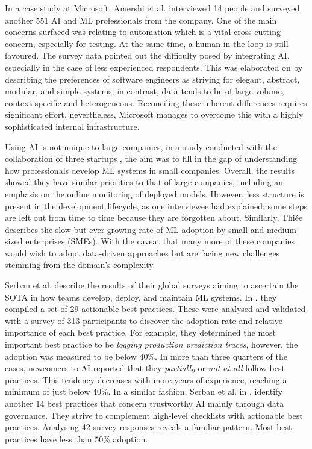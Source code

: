 In a case study at Microsoft, Amershi et al. \cite{amershi2019software} interviewed 14 people and surveyed another 551 AI and ML professionals from the company. One of the main concerns surfaced was relating to automation which is a vital cross-cutting concern, especially for testing. At the same time, a human-in-the-loop is still favoured. The survey data pointed out the difficulty posed by integrating AI, especially in the case of less experienced respondents. This was elaborated on by describing the preferences of software engineers as striving for elegant, abstract, modular, and simple systems; in contrast, data tends to be of large volume, context-specific and heterogeneous. Reconciling these inherent differences requires significant effort, nevertheless, Microsoft manages to overcome this with a highly sophisticated internal infrastructure.

Using AI is not unique to large companies, in a study conducted with the collaboration of three startups \cite{de2019understanding}, the aim was to fill in the gap of understanding how professionals develop ML systems in small companies. Overall, the results showed they have similar priorities to that of large companies, including an emphasis on the online monitoring of deployed models. However, less structure is present in the development lifecycle, as one interviewee had explained: some steps are left out from time to time because they are forgotten about.
Similarly, Thiée \cite{thiee2021systematic} describes the slow but ever-growing rate of ML adoption by small and medium-sized enterprises (SMEs). With the caveat that many more of these companies would wish to adopt data-driven approaches but are facing new challenges stemming from the domain's complexity.

Serban et al. \cite{serban2020adoption,serban2021practices} describe the results of their global surveys aiming to ascertain the SOTA in how teams develop, deploy, and maintain ML systems. In \cite{serban2020adoption}, they compiled a set of 29 actionable best practices. These were analysed and validated with a survey of 313 participants to discover the adoption rate and relative importance of each best practice. For example, they determined the most important best practice to be \textit{logging production prediction traces}, however, the adoption was measured to be below 40\%. In more than three quarters of the cases, newcomers to AI reported that they \textit{partially} or \textit{not at all} follow best practices. This tendency decreases with more years of experience, reaching a minimum of just below 40\%. In a similar fashion, Serban et al. in \cite{serban2021practices}, identify another 14 best practices that concern trustworthy AI mainly through data governance. They strive to complement high-level checklists with actionable best practices. Analysing 42 survey responses reveals a familiar pattern. Most best practices have less than 50\% adoption.


